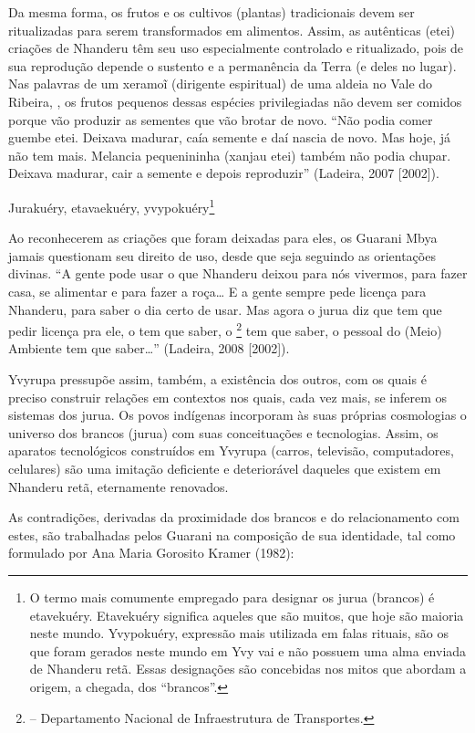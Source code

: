 Da mesma forma, os frutos e os cultivos (plantas) tradicionais devem ser
ritualizadas para serem transformados em alimentos. Assim, as
autênticas (etei) criações de Nhanderu têm seu uso especialmente
controlado e ritualizado, pois de sua reprodução depende o sustento e a
permanência da Terra (e deles no lugar). Nas palavras de um
xeramoĩ (dirigente espiritual) de uma aldeia no
Vale do Ribeira, , os frutos pequenos dessas espécies privilegiadas
não devem ser comidos porque vão produzir as sementes que vão brotar de
novo. ``Não podia comer guembe etei. Deixava madurar, caía semente e daí
nascia de novo. Mas hoje, já não tem mais. Melancia pequenininha
(xanjau etei) também não podia chupar. Deixava madurar, cair a semente
e depois reproduzir'' (Ladeira, 2007 [2002]).

Jurakuéry, etavaekuéry, yvypokuéry\footnote{O termo mais comumente
empregado para designar os jurua (brancos) é etavekuéry. Etavekuéry
significa aqueles que são muitos, que hoje são maioria neste mundo.
Yvypokuéry, expressão mais utilizada em falas rituais, são os que foram
gerados neste mundo em Yvy vai e não possuem uma alma enviada de
Nhanderu retã. Essas designações são concebidas nos mitos que abordam a
origem, a chegada, dos ``brancos''.}

Ao reconhecerem as criações que foram deixadas para eles, os Guarani
Mbya jamais questionam seu direito de uso, desde que seja seguindo as
orientações divinas. ``A gente pode usar o que Nhanderu deixou para nós
vivermos, para fazer casa, se alimentar e para fazer a roça\ldots{} E a
gente sempre pede licença para Nhanderu, para saber o dia certo de
usar. Mas agora o jurua diz que tem que pedir licença pra ele, o 
tem que saber, o \footnote{ – Departamento Nacional de
Infraestrutura de Transportes.} tem que saber, o pessoal do (Meio)
Ambiente tem que saber\ldots{}'' (Ladeira, 2008 [2002]).

Yvyrupa pressupõe assim, também, a existência dos outros, com os quais é
preciso construir relações em contextos nos quais, cada vez mais, se
inferem os sistemas dos jurua. Os povos indígenas incorporam às suas
próprias cosmologias o universo dos brancos (jurua) com suas
conceituações e tecnologias. Assim, os aparatos tecnológicos
construídos em Yvyrupa (carros, televisão, computadores, celulares) são
uma imitação deficiente e deteriorável daqueles que existem em Nhanderu
retã, eternamente renovados.

As contradições, derivadas da proximidade dos brancos e do
relacionamento com estes, são trabalhadas pelos Guarani na  composição
de sua identidade, tal como formulado por Ana Maria Gorosito Kramer
(1982):  

